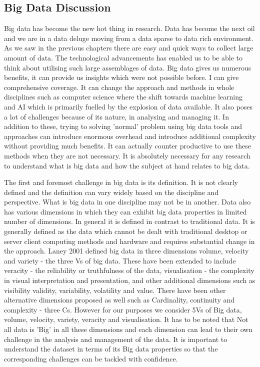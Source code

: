 \subsection{Big Data Discussion}

Big data has become the new hot thing in research.
Data has become the next oil and we are in a data deluge moving from a data sparse to data rich environment.
As we saw in the previous chapters there are easy and quick ways to collect large amount of data.
The technological advancements has enabled us to be able to think about utilising such large assemblages of data.
Big data gives us numerous benefits, it can provide us insights which were not possible before.
I can give comprehensive coverage.
It can change the approach and methods in whole disciplines such as computer science where the shift towards machine learning and AI which is primarily fuelled by the explosion of data available.
It also poses a lot of challenges because of its nature, in analysing and managing it.
In addition to these, trying to solving 'normal' problem using big data tools and approaches can introduce enormous overhead and introduce additional complexity without providing much benefits.
It can actually counter productive to use these methods when they are not necessary.
It is absolutely necessary for any research to understand what is big data and how the subject at hand relates to big data.

The first and foremost challenge in big data is its definition.
It is not clearly defined and the definition can vary widely based on the discipline and perspective.
What is big data in one discipline may not be in another.
Data also has various dimensions in which they can exhibit big data properties in limited number of dimensions.
In general it is defined in contrast to traditional data.
It is generally defined as the data which cannot be dealt with traditional desktop or server client computing methods and hardware and requires substantial change in the approach.
Laney 2001 defined big data in three dimensions volume, velocity and variety - the three Vs of big data.
These have been extended to include veracity - the reliability or truthfulness of the data, visualisation - the complexity in visual interpretation and presentation, and other additional dimensions such as visibility validity, variability, volatility and value.
There have been other alternative dimensions proposed as well such as Cardinality, continuity and complexity - three Cs.
However for our purposes we consider 5Vs of Big data, volume, velocity, variety, veracity and visualisation.
It has to be noted that Not all data is 'Big' in all these dimensions and each dimension can lead to their own challenge in the analysis and management of the data.
It is important to understand the dataset in terms of its Big data properties so that the corresponding challenges can be tackled with confidence.

